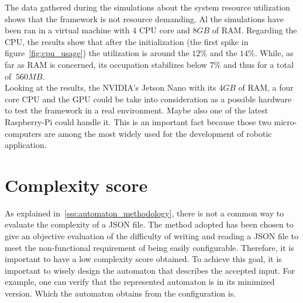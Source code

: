 \documentclass[../thesis.tex]{subfiles}
\begin{document}
The data gathered during the simulations about the system resource utilization shows that the framework is not resource demanding. Al the simulations have been ran in a virtual machine with $4$ CPU core and $8GB$ of RAM. Regarding the CPU, the results show that after the initialization (the first spike in figure~\ref{fig:cpu_usage}) the utilization is around the $12\%$ and the $14\%$. While, as far as RAM is concerned, its occupation stabilizes below $7\%$ and thus for a total of $~560MB$.\\

Looking at the results, the NVIDIA's Jetson Nano with its $4GB$ of RAM, a four core CPU and the GPU could be take into consideration as a possible hardware to test the framework in a real environment. Maybe also one of the latest Raspberry-Pi could handle it. This is an important fact because those two micro-computers are among the most widely used for the development of robotic application. 
 
\section{Complexity score}
As explained in~\ref{sss:automaton_methodology}, there is not a common way to evaluate the complexity of a JSON file. The method adopted has been chosen to give an objective evaluation of the difficulty of writing and reading a JSON file to meet the non-functional requirement of being easily configurable.
Therefore, it is important to have a low complexity score obtained. To achieve this goal, it is important to wisely design the automaton that describes the accepted input. For example, one can verify that the represented automaton is in its minimized version. Which the automaton obtains from the configuration is.
\end{document}
